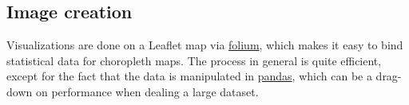 \paragraph{}
\subsection{Image creation}
Visualizations are done on a Leaflet map via \href{https://python-visualization.github.io/folium/}{folium}, which makes it easy to bind statistical data for choropleth maps. The process in general is quite efficient, except for the fact that the data is manipulated in \href{https://pandas.pydata.org/}{pandas}, which can be a drag-down on performance when dealing a large dataset.  

